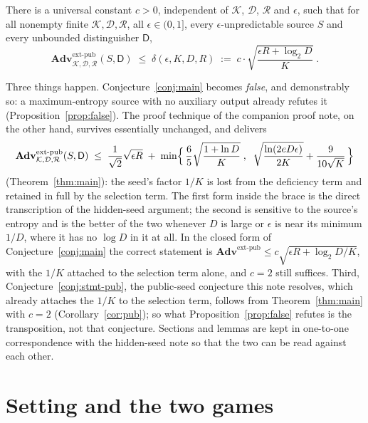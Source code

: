 \documentclass{aicr-solution}
\newcommand{\Adv}{\mathbf{Adv}}
\newcommand{\extp}{\mathrm{ext}\text{-}\mathrm{pub}}
\newcommand{\calK}{\mathcal{K}}
\newcommand{\calD}{\mathcal{D}}
\newcommand{\calR}{\mathcal{R}}
\begin{document}
\begin{conjecture}\label{conj:main}
There is a universal constant $c > 0$, independent of $\calK$, $\calD$, $\calR$ and $\epsilon$, such
that for all nonempty finite $\calK, \calD, \calR$, all $\epsilon \in (0,1]$, every
$\epsilon$-unpredictable source $S$ and every unbounded distinguisher $\mathsf{D}$,
\[
  \Adv^{\extp}_{\calK,\calD,\calR}(S,\mathsf{D})
  \;\le\; \delta(\epsilon,K,D,R)
  \;:=\; c \cdot \sqrt{\frac{\epsilon R + \log_2 D}{K}} \; .
\]
\end{conjecture}

\noindent
Three things happen. Conjecture~\ref{conj:main} becomes \emph{false}, and demonstrably so: a
maximum-entropy source with no auxiliary output already refutes it
(Proposition~\ref{prop:false}). The proof technique of the companion proof note, on the other
hand, survives essentially unchanged, and delivers
\[
  \Adv^{\extp}_{\calK,\calD,\calR}(S,\mathsf{D})
  \;\le\; \frac{1}{\sqrt{2}}\sqrt{\epsilon R}
  \;+\; \min\Bigl\{\, \frac{6}{5}\sqrt{\frac{1 + \ln D}{K}} \;,\;\;
        \sqrt{\frac{\ln(2eD\epsilon)}{2K}} + \frac{9}{10\sqrt{K}} \,\Bigr\}
\]
(Theorem~\ref{thm:main}): the seed's factor $1/K$ is lost from the deficiency term and retained in
full by the selection term. The first form inside the brace is the direct transcription of the
hidden-seed argument; the second is sensitive to the source's entropy and is the better of the two
whenever $D$ is large or $\epsilon$ is near its minimum $1/D$, where it has no $\log D$ in it at
all. In the closed form of Conjecture~\ref{conj:main} the correct statement is
$\Adv^{\extp} \le c\sqrt{\epsilon R + \log_2 D / K}$, with the $1/K$ attached to the selection term
alone, and $c = 2$ still suffices. Third, Conjecture~\ref{conj:stmt-pub}, the public-seed
conjecture this note resolves, which already attaches the $1/K$ to the selection term, follows from
Theorem~\ref{thm:main} with $c = 2$ (Corollary~\ref{cor:pub}); so what
Proposition~\ref{prop:false} refutes is the transposition, not that conjecture. Sections and lemmas are kept in one-to-one correspondence with
the hidden-seed note so that the two can be read against each other.

\section{Setting and the two games}\label{sec:setting}
\end{document}
